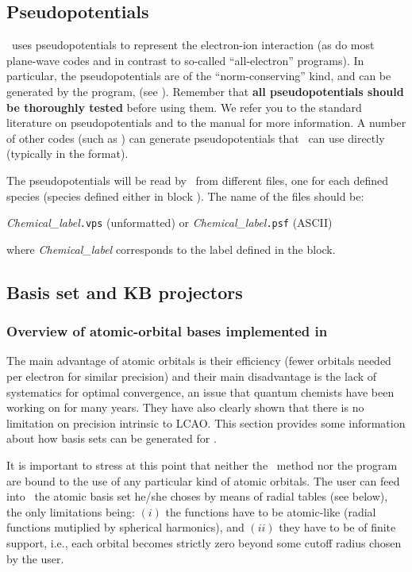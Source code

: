 \subsection{Pseudopotentials}

\siesta\ uses pseudopotentials to represent the electron-ion
interaction (as do most plane-wave codes and in contrast to so-called
``all-electron'' programs). In particular, the pseudopotentials are of
the ``norm-conserving'' kind, and can be generated by the  program,
(see ). Remember that \textbf{all pseudopotentials
  should be thoroughly tested} before using them. We refer you to the
standard literature on pseudopotentials and to the  manual
for more information. A number of
other codes (such as ) can generate pseudopotentials that
\siesta\ can use directly (typically in the  format).

The pseudopotentials will be read by \siesta\ from different files, one
for each defined species (species defined either in block
).
The name of the files should be:

\textit{Chemical\_label}\texttt{.vps} (unformatted) or
\textit{Chemical\_label}\texttt{.psf} (ASCII)

\noindent
where \textit{Chemical\_label} corresponds to the label defined in the
 block.


\subsection{Basis set and KB projectors}

\subsubsection{Overview of atomic-orbital bases implemented in \texorpdfstring{\siesta}{SIESTA}}

The main advantage of atomic orbitals is their efficiency (fewer orbitals
needed per electron for similar precision)
and their main disadvantage is the lack of systematics for optimal
convergence, an issue that quantum chemists have been working on for
many years. They have also clearly shown that there
is no limitation on precision intrinsic to LCAO.
This section provides some information about how basis sets can be
generated for \siesta.

It is important to stress at this point that neither the \siesta\
method nor the program
are bound to the use of any particular kind of atomic orbitals. The
user can feed into \siesta\ the atomic basis set he/she choses by
means of radial tables (see \fdf{User.Basis} below), the
only limitations being: $(i)$ the functions have to be atomic-like (radial
functions mutiplied by spherical harmonics), and $(ii)$ they have to be
of finite support, i.e., each orbital becomes strictly zero beyond some
cutoff radius chosen by the user.

